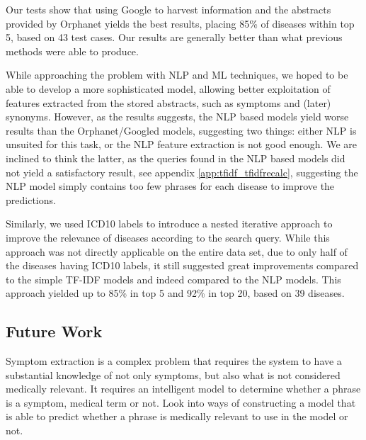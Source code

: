 \documentclass[10pt,letterpaper,two column,final]{article}
\begin{document}

Our tests show that using Google to harvest information and the
abstracts provided by Orphanet yields the best results, placing 85\% of
diseases within top 5, based on 43 test cases. Our results are
generally better than what previous methods were able to produce.


While approaching the problem with NLP and ML techniques, we hoped to be
able to develop a more sophisticated model, allowing better exploitation
of features extracted from the stored abstracts, such as symptoms and
(later) synonyms. However, as the results suggests, the NLP based models
yield worse results than the Orphanet/Googled models, suggesting two
things: either NLP is unsuited for this task, or the NLP feature
extraction is not good enough. We are inclined to think the latter, as
the queries found in the NLP based models did not yield a satisfactory
result, see appendix \ref{app:tfidf_tfidfrecalc}, suggesting the NLP
model simply contains too few phrases for each disease to improve the
predictions.

Similarly, we used ICD10 labels to introduce a nested iterative approach
to improve the relevance of diseases according to the search query.
While this approach was not directly applicable on the entire data set,
due to only half of the diseases having ICD10 labels, it still suggested
great improvements compared to the simple TF-IDF models and indeed
compared to the NLP models. This approach yielded up to 85\% in top 5
and 92\% in top 20, based on 39 diseases.



\subsection{Future Work}
Symptom extraction is a complex problem that requires the system to have
a substantial knowledge of not only symptoms, but also what is not
considered medically relevant. It requires an intelligent model to
determine whether a phrase is a symptom, medical term or not. Look into
ways of constructing a model that is able to predict whether a phrase
is medically relevant to use in the model or not.
\end{document}
